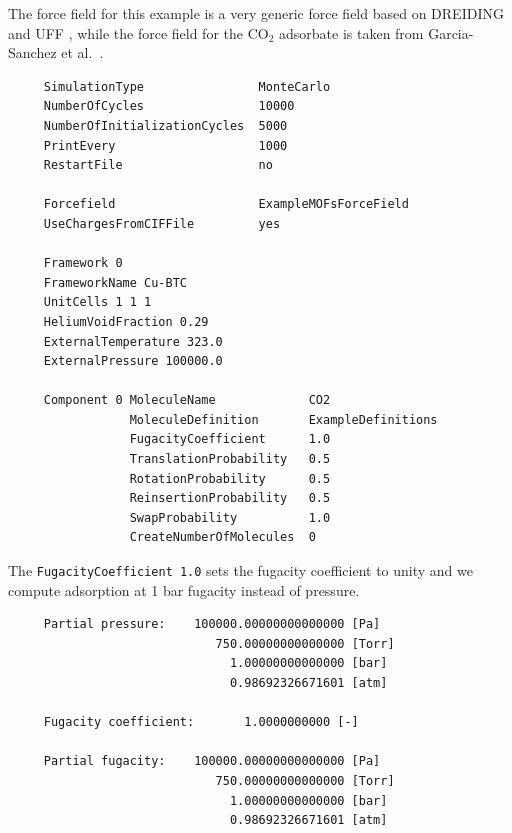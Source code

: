 The force field for this example is a very generic force field based on DREIDING \cite{Mayo1990} and UFF \cite{Rappe1992}, while
the force field for the CO$_2$ adsorbate is taken from Garcia-Sanchez et al.\ \cite{GarciaSanchez2009}.
\begin{tiny}
\begin{verbatim}
     SimulationType                MonteCarlo
     NumberOfCycles                10000
     NumberOfInitializationCycles  5000
     PrintEvery                    1000
     RestartFile                   no

     Forcefield                    ExampleMOFsForceField
     UseChargesFromCIFFile         yes

     Framework 0
     FrameworkName Cu-BTC
     UnitCells 1 1 1
     HeliumVoidFraction 0.29
     ExternalTemperature 323.0
     ExternalPressure 100000.0

     Component 0 MoleculeName             CO2
                 MoleculeDefinition       ExampleDefinitions
                 FugacityCoefficient      1.0
                 TranslationProbability   0.5
                 RotationProbability      0.5
                 ReinsertionProbability   0.5
                 SwapProbability          1.0
                 CreateNumberOfMolecules  0
\end{verbatim}
\end{tiny}
The \verb+FugacityCoefficient 1.0+ sets the fugacity coefficient to unity and we compute adsorption at 1 bar fugacity instead of pressure.
\begin{tiny}
\begin{verbatim}
     Partial pressure:    100000.00000000000000 [Pa]
                             750.00000000000000 [Torr]
                               1.00000000000000 [bar]
                               0.98692326671601 [atm]

     Fugacity coefficient:       1.0000000000 [-]

     Partial fugacity:    100000.00000000000000 [Pa]
                             750.00000000000000 [Torr]
                               1.00000000000000 [bar]
                               0.98692326671601 [atm]
\end{verbatim}
\end{tiny}

